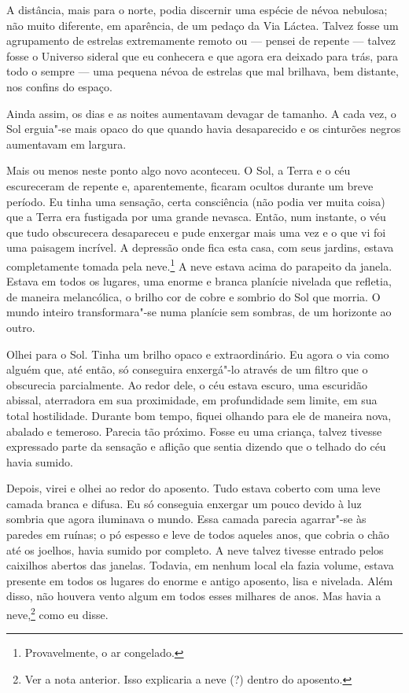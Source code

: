 A distância, mais para o norte, podia discernir uma espécie de névoa nebulosa; não muito diferente, em aparência, de um
pedaço da Via Láctea. Talvez fosse um agrupamento de estrelas extremamente remoto ou --- pensei de repente --- talvez
fosse o Universo sideral que eu conhecera e que agora era deixado para trás, para todo o sempre --- uma pequena névoa de
estrelas que mal brilhava, bem distante, nos confins do espaço.

Ainda assim, os dias e as noites aumentavam devagar de tamanho. A cada vez, o Sol erguia"-se mais opaco do que quando
havia desaparecido e os cinturões negros aumentavam em largura.

Mais ou menos neste ponto algo novo aconteceu. O Sol, a Terra e o céu escureceram de repente e, aparentemente,
ficaram ocultos durante um breve período. Eu tinha uma sensação, certa consciência (não podia ver muita coisa) que a
Terra era fustigada por uma grande nevasca. Então, num instante, o véu que tudo obscurecera desapareceu e pude
enxergar mais uma vez e o que vi foi uma paisagem incrível. A depressão onde fica esta casa, com seus jardins,
estava completamente tomada pela neve.\footnote{ Provavelmente, o ar congelado.} 
A neve estava acima do parapeito da janela. Estava em todos os lugares, uma
enorme e branca planície nivelada que refletia, de maneira melancólica, o brilho cor de cobre e sombrio do Sol que
morria. O mundo inteiro transformara"-se numa planície sem sombras, de um horizonte ao outro.

Olhei para o Sol. Tinha um brilho opaco e extraordinário. Eu agora o via como alguém que, até então, só conseguira
enxergá"-lo através de um filtro que o obscurecia parcialmente. Ao redor dele, o céu estava escuro, uma escuridão
abissal, aterradora em sua proximidade, em profundidade sem limite, em sua total hostilidade. Durante bom tempo,
fiquei olhando para ele de maneira nova, abalado e temeroso. Parecia tão próximo. Fosse eu uma criança, talvez tivesse
expressado parte da sensação e aflição que sentia dizendo que o telhado do céu havia sumido.

Depois, virei e olhei ao redor do aposento. Tudo estava coberto com uma leve camada branca e difusa. Eu
só conseguia enxergar um pouco devido à luz sombria que agora iluminava o mundo. Essa camada parecia agarrar"-se às
paredes em ruínas; o pó espesso e leve de todos aqueles anos, que cobria o chão até os joelhos, havia sumido por
completo. A neve talvez tivesse entrado pelos caixilhos abertos das janelas. Todavia, em nenhum local ela fazia volume,
estava presente em todos os lugares do enorme e antigo aposento, lisa e nivelada. Além disso, não houvera vento algum
em todos esses milhares de anos. Mas havia a neve,\footnote{ Ver a nota
anterior. Isso explicaria a neve (?) dentro do aposento.} como eu disse.

